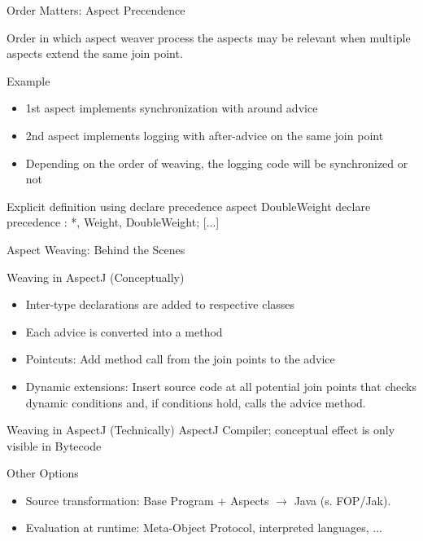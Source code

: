 \begin{frame}[fragile]{Order Matters: Aspect Precendence}
	\begin{mycolumns}[widths={50,50},animation=none]
		\begin{note}{}
			Order in which aspect weaver process the aspects may be relevant when multiple aspects extend the same join point.
		\end{note}
		\begin{example}{Example}
			\begin{itemize}
				\item 1st aspect implements synchronization with around advice
				\item 2nd aspect implements logging with after-advice on the same join point
				\item Depending on the order of weaving, the logging code will be synchronized or not
			\end{itemize}
		\end{example}
	\mynextcolumn
\begin{codetight}{Explicit definition using declare precedence}
aspect DoubleWeight {
	declare precedence : *, Weight, DoubleWeight;
	[...]
}
\end{codetight}	
	\end{mycolumns}
\end{frame}

\begin{frame}{Aspect Weaving: Behind the Scenes }
	\begin{mycolumns}[widths={50,50},animation=none]
		\begin{definition}{Weaving in AspectJ (Conceptually)}
			\begin{itemize}
				\item Inter-type declarations are added to respective classes
				\item Each advice is converted into a method
				\item Pointcuts: Add method call from the join points to the advice
				\item Dynamic extensions: Insert source code at all potential join points that checks dynamic conditions and, if conditions hold, calls the advice method.
			\end{itemize}
		\end{definition}
	\mynextcolumn
		\begin{note}{Weaving in AspectJ (Technically)}
			AspectJ Compiler; conceptual effect is only visible in Bytecode
		\end{note}
		\begin{note}{Other Options}
			\begin{itemize}
				\item Source transformation: Base Program + Aspects $\rightarrow$ Java (s. FOP/Jak).
				\item Evaluation at runtime: Meta-Object Protocol, interpreted languages, ...
			\end{itemize}
		\end{note}
	\end{mycolumns}
\end{frame}

